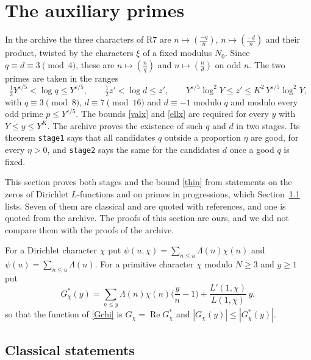 \documentclass[11pt,letterpaper]{article}
\numberwithin{equation}{section}
\begin{document}
\section{The auxiliary primes}\label{sec:r7}

In the archive the three characters of R7 are $n\mapsto(\tfrac{-q}{n})$, $n\mapsto(\tfrac{-d}{n})$ and their product, twisted by the characters $\xi$ of a fixed modulus $N_0$. Since $q\equiv d\equiv3\pmod4$, these are $n\mapsto(\tfrac nq)$ and $n\mapsto(\tfrac nd)$ on odd $n$. The two primes are taken in the ranges
\[
\tfrac12Y^{\varepsilon/5}<\log q\le Y^{\varepsilon/5},\qquad \tfrac12z'<\log d\le z',\qquad Y^{\varepsilon/5}\log^2Y\le z'\le K^2\,Y^{\varepsilon/5}\log^2Y,
\]
with $q\equiv3\pmod8$, $d\equiv7\pmod{16}$ and $d\equiv-1$ modulo $q$ and modulo every odd prime $p\le Y^{\varepsilon/5}$. The bounds \eqref{valx} and \eqref{ellx} are required for every $y$ with $Y\le y\le Y^K$. The archive proves the existence of such $q$ and $d$ in two stages. Its theorem \texttt{stage1} says that all candidates $q$ outside a proportion $\eta$ are good, for every $\eta>0$, and \texttt{stage2} says the same for the candidates $d$ once a good $q$ is fixed.

This section proves both stages and the bound \eqref{thin} from statements on the zeros of Dirichlet $L$-functions and on primes in progressions, which Section~\ref{sec:classical} lists. Seven of them are classical and are quoted with references, and one is quoted from the archive. The proofs of this section are ours, and we did not compare them with the proofs of the archive.

For a Dirichlet character $\chi$ put $\psi(u,\chi)=\sum_{n\le u}\Lambda(n)\chi(n)$ and $\psi(u)=\sum_{n\le u}\Lambda(n)$. For a primitive character $\chi$ modulo $N\ge3$ and $y\ge1$ put
\[
G^\ast_\chi(y)=\sum_{n\le y}\Lambda(n)\chi(n)\Big(\frac yn-1\Big)+\frac{L'(1,\chi)}{L(1,\chi)}\,y ,
\]
so that the function of \eqref{Gchi} is $G_\chi=\operatorname{Re}G^\ast_\chi$ and $|G_\chi(y)|\le|G^\ast_\chi(y)|$.

\subsection{Classical statements}\label{sec:classical}
\end{document}
